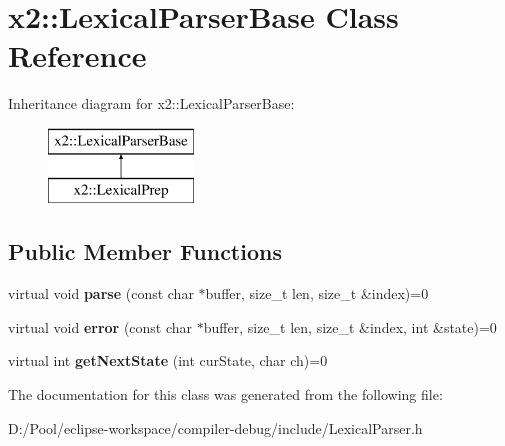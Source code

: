 \hypertarget{classx2_1_1_lexical_parser_base}{}\section{x2\+:\+:Lexical\+Parser\+Base Class Reference}
\label{classx2_1_1_lexical_parser_base}
Inheritance diagram for x2\+:\+:Lexical\+Parser\+Base\+:\begin{figure}[H]
\begin{center}
\leavevmode
\includegraphics[height=2.000000cm]{classx2_1_1_lexical_parser_base}
\end{center}
\end{figure}
\subsection*{Public Member Functions}
\begin{DoxyCompactItemize}
\item 
\mbox{\label{classx2_1_1_lexical_parser_base_a3db73300fe1d9a3ebb9778c0b11aa345}} 
virtual void {\bfseries parse} (const char $\ast$buffer, size\+\_\+t len, size\+\_\+t \&index)=0
\item 
\mbox{\label{classx2_1_1_lexical_parser_base_a5cb3232295603aca19cf732db66c3709}} 
virtual void {\bfseries error} (const char $\ast$buffer, size\+\_\+t len, size\+\_\+t \&index, int \&state)=0
\item 
\mbox{\label{classx2_1_1_lexical_parser_base_a7070565fd2865aeba4145f396722833d}} 
virtual int {\bfseries get\+Next\+State} (int cur\+State, char ch)=0
\end{DoxyCompactItemize}


The documentation for this class was generated from the following file\+:\begin{DoxyCompactItemize}
\item 
D\+:/\+Pool/eclipse-\/workspace/compiler-\/debug/include/Lexical\+Parser.\+h\end{DoxyCompactItemize}
